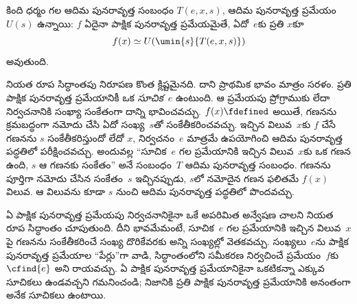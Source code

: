 \documentclass[../../../include/open-logic-section]{subfiles}
\begin{document}

\begin{thm}[క్లీనీ నియత రూప సిద్ధాంతం]
కింది ధర్మం గల ఆదిమ పునరావృత్త సంబంధం $T(e,x,s)$, ఆదిమ పునరావృత్త
ప్రమేయం $U(s)$ ఉన్నాయి: $f$ ఏదైనా పాక్షిక పునరావృత్త ప్రమేయమైతే,
ఏదో~$e$కు ప్రతి $x$కూ
\[
f(x) \simeq U(\umin{s}{T(e, x, s)})
\]
అవుతుంది.
\end{thm}

\begin{explain}
నియత రూప సిద్ధాంతపు నిరూపణ కొంత క్లిష్టమైనది. దాని ప్రాథమిక భావం మాత్రం
సరళం. ప్రతి పాక్షిక పునరావృత్త ప్రమేయానికీ ఒక \emph{సూచిక}~$e$ ఉంటుంది.
ఆ ప్రమేయపు ప్రోగ్రాముకు లేదా నిర్వచనానికి సంఖ్యా సంకేతంగా దాన్ని భావించవచ్చు.
$f(x)\fdefined$ అయితే, గణనను క్రమబద్ధంగా నమోదు చేసి ఏదో సంఖ్య~$s$తో
సంకేతీకరించవచ్చు. ఇచ్చిన విలువ~$x$కు $f$ చేసే గణనను $s$
సంకేతీకరిస్తుందో లేదో $x$, నిర్వచనం~$e$ మాత్రమే ఉపయోగించి
ఆదిమ పునరావృత్త పద్ధతిలో పరీక్షించవచ్చు. అందువల్ల ``సూచిక~$e$ గల ప్రమేయానికి
ఇచ్చిన విలువ~$x$కు ఒక గణన ఉంది, $s$ ఆ గణనకు సంకేతం'' అనే సంబంధం~$T$
ఆదిమ పునరావృత్త సంబంధం. గణనను పూర్తిగా నమోదు చేసిన సంకేతం~$s$
ఇచ్చినప్పుడు, $s$లో నమోదైన గణన ఫలితమే $f(x)$ విలువ. ఆ విలువను కూడా
$s$ నుంచి ఆదిమ పునరావృత్త పద్ధతిలో పొందవచ్చు.

ఏ పాక్షిక పునరావృత్త ప్రమేయపు నిర్వచనానికైనా ఒకే అపరిమిత అన్వేషణ
చాలని నియత రూప సిద్ధాంతం చూపుతుంది. దీని భావమేమంటే, సూచిక~$e$ గల
ప్రమేయానికి ఇచ్చిన విలువ~$x$పై గణనను సంకేతీకరించే సంఖ్య దొరికేవరకు అన్ని
సంఖ్యల్లో వెతకవచ్చు. సంఖ్యలు~$e$ను పాక్షిక పునరావృత్త ప్రమేయాల
``పేర్లు''గా వాడి, సిద్ధాంతంలోని సమీకరణ నిర్వచించే ప్రమేయం~$f$కు
$\cfind{e}$ అని రాయవచ్చు. ఏ పాక్షిక పునరావృత్త ప్రమేయానికైనా ఒకటికన్నా
ఎక్కువ సూచికలు ఉండవచ్చని గమనించండి; నిజానికి ప్రతి పాక్షిక పునరావృత్త
ప్రమేయానికి అనంతంగా అనేక సూచికలు ఉంటాయి.
\end{explain}
\end{document}
